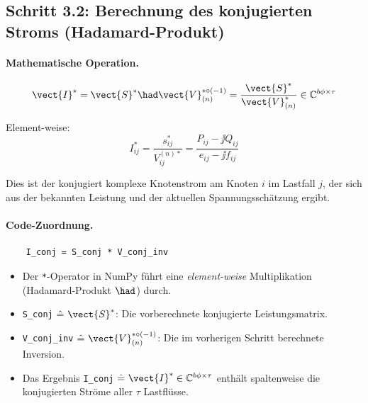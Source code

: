 \subsection{Schritt 3.2: Berechnung des konjugierten Stroms (Hadamard-Produkt)}
\label{subsec:strom_berechnung}

\paragraph{Mathematische Operation.}
\begin{equation}
	\vect{I}^* = \vect{S}^* \had \vect{V}_{(n)}^{*\circ(-1)} = \frac{\vect{S}^*}{\vect{V}_{(n)}^*} \in \mathbb{C}^{b\phi \times \tau}
	\label{eq:strom_matrix}
\end{equation}

Element-weise:
\begin{equation}
	I_{ij}^* = \frac{s_{ij}^*}{V_{ij}^{(n)*}} = \frac{P_{ij} - \jj Q_{ij}}{e_{ij} - \jj f_{ij}}
	\label{eq:strom_element}
\end{equation}

Dies ist der konjugiert komplexe Knotenstrom am Knoten $i$ im Lastfall $j$, der sich aus der bekannten Leistung und der aktuellen Spannungsschätzung ergibt.

\paragraph{Code-Zuordnung.}
\begin{verbatim}
	I_conj = S_conj * V_conj_inv
\end{verbatim}

\begin{itemize}
	\item Der \texttt{*}-Operator in NumPy führt eine \textit{element-weise} Multiplikation (Hadamard-Produkt $\had$) durch.
	\item \texttt{S\_conj} $\hat{=}\ \vect{S}^*$: Die vorberechnete konjugierte Leistungsmatrix.
	\item \texttt{V\_conj\_inv} $\hat{=}\ \vect{V}_{(n)}^{*\circ(-1)}$: Die im vorherigen Schritt berechnete Inversion.
	\item Das Ergebnis \texttt{I\_conj} $\hat{=}\ \vect{I}^* \in \mathbb{C}^{b\phi \times \tau}$ enthält spaltenweise die konjugierten Ströme aller $\tau$ Lastflüsse.
\end{itemize}

